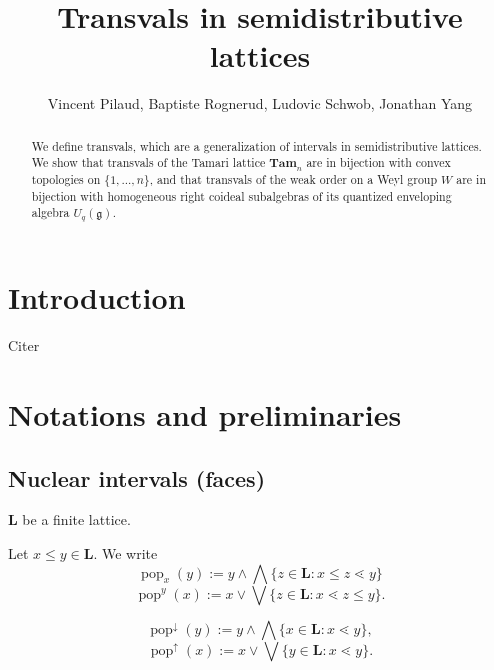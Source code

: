 \documentclass[leqno, 12pt]{amsart}
\title{Transvals in semidistributive lattices}
\author{Vincent Pilaud, Baptiste Rognerud, Ludovic Schwob, Jonathan Yang}
\numberwithin{equation}{section}
\newcommand{\Tam}{\mathbf{Tam}}
\renewcommand{\L}{\mathbf L}
\newcommand{\pop}{\operatorname{pop}}
\newcommand{\popdown}{\operatorname{pop}^\downarrow}
\newcommand{\popup}{\operatorname{pop}^\uparrow}
\numberwithin{equation}{section}
\theoremstyle{remark}
\begin{document}
	
	\begin{abstract}
	We define transvals, which are a generalization of intervals in semidistributive lattices.
	We show that transvals of the Tamari lattice $\Tam_n$ are in bijection with convex topologies on $\{1,...,n\}$, and that transvals of the weak order on a Weyl group $W$ are in bijection with homogeneous right coideal subalgebras of its quantized enveloping algebra $U_q(\mathfrak g)$.
	\end{abstract}
	
	\maketitle
	
	\tableofcontents
	\section{Introduction}
	
Citer \cite{Hans24} \cite{ClRi15} \cite{BGPPST26} \cite{CPP19} \cite{HeKo12} 
		
\section{Notations and preliminaries}
\subsection{Nuclear intervals (faces)}


%
%
%

   $\L$ be a finite lattice.
  
Let $x\le y\in \L$. We write
    $$\pop_x(y):=y\wedge \bigwedge \{z\in \L: x\le z\lessdot y\}$$
    $$\pop^y(x):=x\vee\bigvee \{z\in \L: x\lessdot z\le y\}.$$

$$\popdown(y):=y\wedge \bigwedge\{x\in \L:x\lessdot y\},$$
$$\popup(x):=x\vee \bigvee\{y\in \L:x\lessdot y\}.$$
\end{document}
